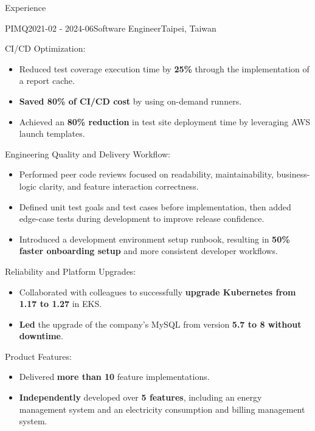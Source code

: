 \documentclass[
	11pt, %
]{resume} %
\newenvironment{myitemize}
  {\begin{itemize}
    \setlength{\itemsep}{-0.5em} \vspace{-0.5em}
  } %
  {\end{itemize}}
\begin{document}
\begin{rSection}{Experience}
	\begin{rSubsection}{PIMQ}{2021-02 - 2024-06}{Software Engineer}{Taipei, Taiwan}
    \item CI/CD Optimization:
    \begin{myitemize}
      \item Reduced test coverage execution time by \textbf{25\%} through the implementation of a report cache.
      \item \textbf{Saved 80\% of CI/CD cost} by using on-demand runners.
      \item Achieved an \textbf{80\% reduction} in test site deployment time by leveraging AWS launch templates.
    \end{myitemize}
    \item Engineering Quality and Delivery Workflow:
    \begin{myitemize}
      \item Performed peer code reviews focused on readability, maintainability, business-logic clarity, and feature interaction correctness.
      \item Defined unit test goals and test cases before implementation, then added edge-case tests during development to improve release confidence.
      \item Introduced a development environment setup runbook, resulting in \textbf{50\% faster onboarding setup} and more consistent developer workflows.
    \end{myitemize}
    \item Reliability and Platform Upgrades:
    \begin{myitemize}
      \item Collaborated with colleagues to successfully \textbf{upgrade Kubernetes from 1.17 to 1.27} in EKS.
      \item \textbf{Led} the upgrade of the company’s MySQL from version \textbf{5.7 to 8 without downtime}.
    \end{myitemize}
    \item Product Features:
    \begin{myitemize}
      \item Delivered \textbf{more than 10} feature implementations.
      \item \textbf{Independently} developed over \textbf{5 features}, including an energy management system and an electricity consumption and billing management system.
    \end{myitemize}
  \end{rSubsection}

\end{rSection}
\end{document}
